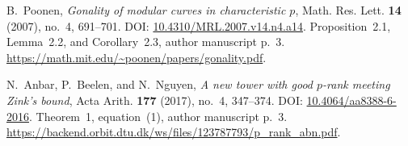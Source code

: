 B.~Poonen,
\emph{Gonality of modular curves in characteristic $p$},
Math. Res. Lett. \textbf{14} (2007), no.~4, 691--701.
DOI: \href{https://doi.org/10.4310/MRL.2007.v14.n4.a14}{10.4310/MRL.2007.v14.n4.a14}.
Proposition~2.1, Lemma~2.2, and Corollary~2.3, author manuscript p.~3.
\url{https://math.mit.edu/~poonen/papers/gonality.pdf}.

N.~Anbar, P.~Beelen, and N.~Nguyen,
\emph{A new tower with good $p$-rank meeting Zink's bound},
Acta Arith. \textbf{177} (2017), no.~4, 347--374.
DOI: \href{https://doi.org/10.4064/aa8388-6-2016}{10.4064/aa8388-6-2016}.
Theorem~1, equation~(1), author manuscript p.~3.
\url{https://backend.orbit.dtu.dk/ws/files/123787793/p_rank_abn.pdf}.
